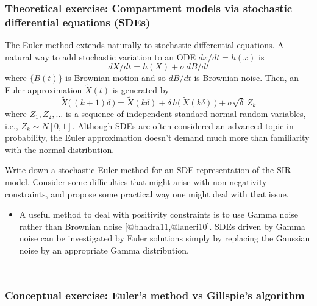 \documentclass[]{article}
\providecommand{\tightlist}{%
  \setlength{\itemsep}{0pt}\setlength{\parskip}{0pt}}
\begin{document}
\subsubsection{Theoretical exercise: Compartment models via stochastic
differential equations
(SDEs)}\label{theoretical-exercise-compartment-models-via-stochastic-differential-equations-sdes}

The Euler method extends naturally to stochastic differential equations.
A natural way to add stochastic variation to an ODE \(dx/dt=h(x)\) is
\[ dX/dt = h(X) + \sigma \, dB/dt\] where \(\{B(t)\}\) is Brownian
motion and so \(dB/dt\) is Brownian noise. Then, an Euler approximation
\(\tilde X(t)\) is generated by
\[ \tilde X\big( \,(k+1)\delta\,\big) = \tilde X( k\delta) + \delta\, h\big(\, \tilde X(k\delta)\,\big) + \sigma \sqrt{\delta} \, Z_k\]
where \(Z_1,Z_2,\dots\) is a sequence of independent standard normal
random variables, i.e., \(Z_k\sim N[0,1]\). Although SDEs are often
considered an advanced topic in probability, the Euler approximation
doesn't demand much more than familiarity with the normal distribution.

Write down a stochastic Euler method for an SDE representation of the
SIR model. Consider some difficulties that might arise with
non-negativity constraints, and propose some practical way one might
deal with that issue.

\begin{itemize}
\tightlist
\item
  A useful method to deal with positivity constraints is to use Gamma
  noise rather than Brownian noise {[}@bhadra11,@laneri10{]}. SDEs
  driven by Gamma noise can be investigated by Euler solutions simply by
  replacing the Gaussian noise by an appropriate Gamma distribution.
\end{itemize}

\begin{center}\rule{0.5\linewidth}{\linethickness}\end{center}

\begin{center}\rule{0.5\linewidth}{\linethickness}\end{center}

\subsubsection{Conceptual exercise: Euler's method vs Gillspie's
algorithm}\label{conceptual-exercise-eulers-method-vs-gillspies-algorithm}
\end{document}
